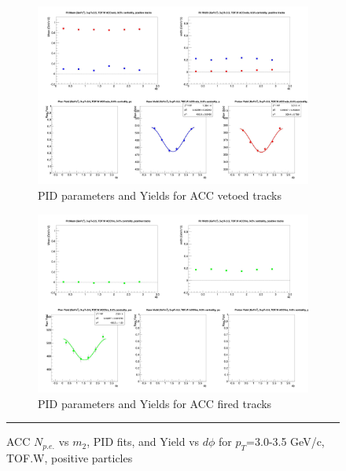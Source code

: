 \begin{figure}[H]
  \ContinuedFloat
    \begin{subfigure}{1\textwidth}
    \includegraphics[width=1\textwidth]{hiptfits/pos/fitParams_tof2_cent0_ch1_pT-30-35.jpg}
    \caption{PID parameters and Yields for ACC vetoed tracks}
    \end{subfigure}    
    \begin{subfigure}{1\textwidth}
    \includegraphics[width=1\textwidth]{hiptfits/pos/fitParams_tof3_cent0_ch1_pT-30-35.jpg}
    \caption{PID parameters and Yields for ACC fired tracks}
    \end{subfigure} 
    \rule{35em}{0.5pt}
  \caption[ACC $N_{p.e.}$ vs $m_2$, PID fits, and Yield vs $d\phi$ for $p_T$=3.0-3.5 GeV/c, TOF.W, positive particles]{ACC $N_{p.e.}$ vs $m_2$, PID fits, and Yield vs $d\phi$ for $p_T$=3.0-3.5 GeV/c, TOF.W, positive particles}
  \label{fig:acc30-35pos}
\end{figure}

\restoregeometry



\begin{table}
\end{table}
